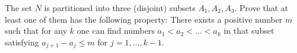 The set $N$ is partitioned into three (disjoint) subsets $A_1,A_2,A_3$.
Prove that at least one of them has the following property: There exists a positive number $m$ such that for any $k$ one can find numbers $a_1 < a_2 < ... < a_k$ in that subset satisfying $a_{j+1} -a_j \le m$ for $j = 1,...,k -1$.